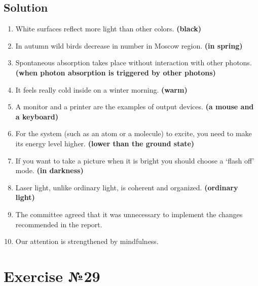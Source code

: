 \subsection*{Solution}
\begin{enumerate}
      \item White surfaces reflect more light than other colors. \textbf{(black)}
      \item In autumn wild birds decrease in number in Moscow region. \textbf{(in spring)}
      \item Spontaneous absorption takes place without interaction with other photons.
      \textbf{(when photon absorption is triggered by other photons)}
      \item It feels really cold inside on a winter morning. \textbf{(warm)}
      \item A monitor and a printer are the examples of output devices. \textbf{(a mouse and
            a keyboard)}
      \item For the system (such as an atom or a molecule) to excite, you need to make
            its energy level higher. \textbf{(lower than the ground state)}
      \item If you want to take a picture when it is bright you should choose a ‘flash
            off’ mode. \textbf{(in darkness)}
      \item Laser light, unlike ordinary light, is coherent and organized. \textbf{(ordinary
            light)}
      \item The committee agreed that it was unnecessary to implement the changes
            recommended in the report.
      \item Our attention is strengthened by mindfulness.
\end{enumerate}

\section{Exercise №29}
